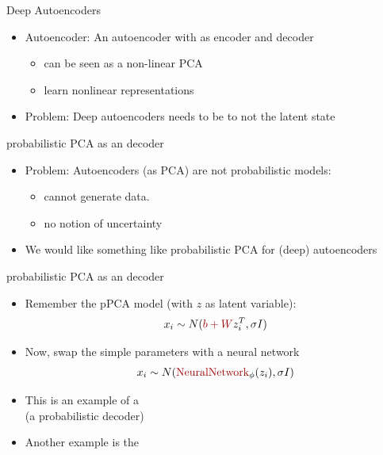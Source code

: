 \documentclass[10pt]{beamer}
\begin{document}
\begin{frame}{Deep Autoencoders}
\begin{itemize}
\item {} Autoencoder: An autoencoder with  as encoder and decoder
\begin{itemize}
\item can be seen as a non-linear PCA
\item learn nonlinear representations
\end{itemize}
\pause
\item Problem: Deep autoencoders needs to be  to not  the latent state
\end{itemize}

\end{frame}


\begin{frame}{probabilistic PCA as an decoder}

\begin{itemize}
\item Problem: Autoencoders (as PCA) are not probabilistic models:
\begin{itemize}
\item cannot generate data.
\item no notion of uncertainty
\end{itemize}
\pause
\item We would like something like probabilistic PCA for (deep) autoencoders
\end{itemize}

\end{frame}

\begin{frame}{probabilistic PCA as an decoder}

\begin{itemize}
\item Remember the pPCA model (with $z$ as latent variable):
\[
x_i \sim N(\uured{b +  W} z_i^T, \sigma I)
\]
\pause
\item Now, swap the simple parameters with a neural network
\[
x_i \sim N(\uured{\text{NeuralNetwork}}_\phi (z_i), \sigma I)
\]
\pause
\item This is an example of a \\(a probabilistic decoder)
\pause
\item Another example is the 
\end{itemize}

\end{frame}
\end{document}
